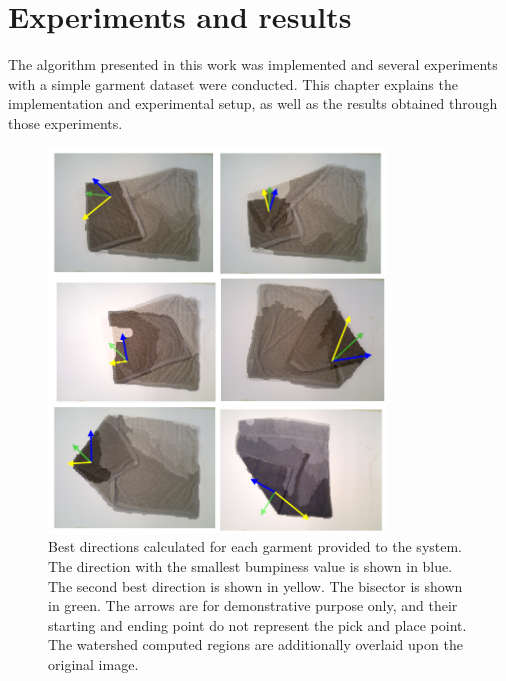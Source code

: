 \chapter{Experiments and results}
\label{experiments_and_results}

The algorithm presented in this work was implemented and several experiments with a simple garment dataset were conducted. This chapter explains the implementation and experimental setup, as well as the results obtained through those experiments.





\begin{figure}[thpb]
    \centering
    \includegraphics[width=0.8\textwidth]{figures/directions_several.png}
    \caption{Best directions calculated for each garment provided to the system. The direction with the smallest bumpiness value is shown in blue. The second best direction is shown in yellow. The bisector is shown in green. The arrows are for demonstrative purpose only, and their starting and ending point do not represent the pick and place point. The watershed computed regions are additionally overlaid upon the original image.}
    \label{directions_several}
\end{figure}
